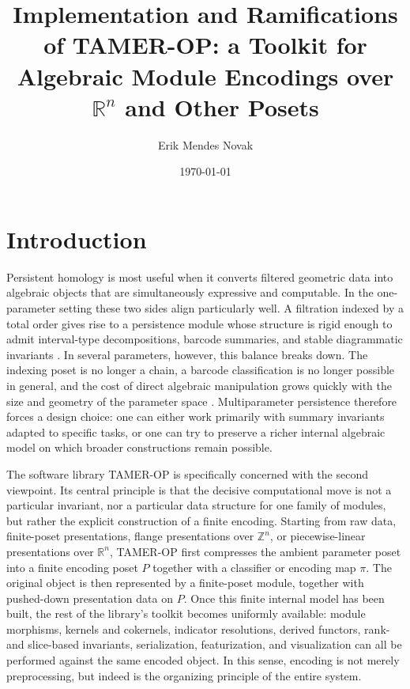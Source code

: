\documentclass[11pt]{article}
\title{Implementation and Ramifications of TAMER-OP: a Toolkit for Algebraic Module Encodings over $\mathbb{R}^n$ and Other Posets}
\author{Erik Mendes Novak}
\date{\today}
\newcommand{\R}{\mathbb{R}}
\newcommand{\Z}{\mathbb{Z}}
\newcommand{\TAMER}{\textsc{TAMER-OP}}
\theoremstyle{definition}
\theoremstyle{remark}
\begin{document}
\maketitle

\newpage
\tableofcontents

\newpage

\section{Introduction}\label{sec:introduction}

Persistent homology is most useful when it converts filtered geometric data into algebraic objects that are simultaneously expressive and computable. In the one-parameter setting these two sides align particularly well. A filtration indexed by a total order gives rise to a persistence module whose structure is rigid enough to admit interval-type decompositions, barcode summaries, and stable diagrammatic invariants \cite{ELZ02,CEH07,CB15,EH10}. In several parameters, however, this balance breaks down. The indexing poset is no longer a chain, a barcode classification is no longer possible in general, and the cost of direct algebraic manipulation grows quickly with the size and geometry of the parameter space \cite{CZ09,Les15,CDSGO16,Oud15}. Multiparameter persistence therefore forces a design choice: one can either work primarily with summary invariants adapted to specific tasks, or one can try to preserve a richer internal algebraic model on which broader constructions remain possible.

The software library \TAMER{} is specifically concerned with the second viewpoint. Its central principle is that the decisive computational move is not a particular invariant, nor a particular data structure for one family of modules, but rather the explicit construction of a finite encoding. Starting from raw data, finite-poset presentations, flange presentations over $\Z^n$, or piecewise-linear presentations over $\R^n$, \TAMER{} first compresses the ambient parameter poset into a finite encoding poset $P$ together with a classifier or encoding map $\pi$. The original object is then represented by a finite-poset module, together with pushed-down presentation data on $P$. Once this finite internal model has been built, the rest of the library's toolkit becomes uniformly available: module morphisms, kernels and cokernels, indicator resolutions, derived functors, rank- and slice-based invariants, serialization, featurization, and visualization can all be performed against the same encoded object. In this sense, encoding is not merely preprocessing, but indeed is the organizing principle of the entire system.
\end{document}
